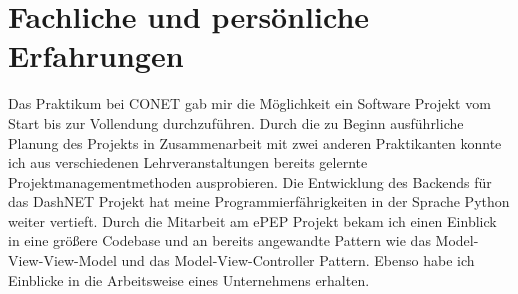 \section{Fachliche und persönliche Erfahrungen}
Das Praktikum bei CONET gab mir die Möglichkeit ein Software Projekt vom Start bis zur Vollendung durchzuführen. Durch die zu Beginn ausführliche Planung des Projekts in Zusammenarbeit mit zwei anderen Praktikanten konnte ich aus verschiedenen Lehrveranstaltungen bereits gelernte Projektmanagementmethoden ausprobieren. Die Entwicklung des Backends für das DashNET Projekt hat meine Programmierfährigkeiten in der Sprache Python weiter vertieft. Durch die Mitarbeit am ePEP Projekt bekam ich einen Einblick in eine größere Codebase und an bereits angewandte Pattern wie das Model-View-View-Model und das Model-View-Controller Pattern. Ebenso habe ich Einblicke in die Arbeitsweise eines Unternehmens erhalten.